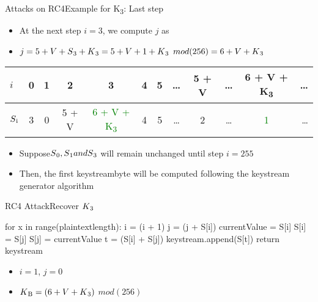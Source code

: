 \documentclass[
	aspectratio=169,	%
	onlytextwidth,		%
	t,					%
	]{beamer}
\begin{document}
\begin{frame}[fragile]{Attacks on RC4}{Example for K\textsubscript{3}: Last step}

	
	\begin{itemize}
		\item At the next step $i = 3$, we compute $j$ as
		\item $j = 5 + V + S\textsubscript{3} + K\textsubscript{3} = 5 + V + 1 + K\textsubscript{3}$ $mod(256) = 6 + V + K\textsubscript{3}$
	\end{itemize}
	
	\begin{table}[h!]
		\begin{center}
			\label{tab:table5}
			\begin{tabular}{l|c|c|c|c|c|c|c|c|c|c|r}
			$i$ & 0 & 1 & 2 & 3 & 4 & 5 & \dots & 5 + V & \dots & 6 + V + K\textsubscript{3} & \dots\\
			\hline
			$S\textsubscript{i}$ & 3 & 0 & 5 + V & \textcolor{green}{6 + V + K\textsubscript{3}} & 4 & 5 & \dots & 2 & \dots & \textcolor{green}{1} & \dots\\
			\end{tabular}
		\end{center}
	\end{table}

	\begin{itemize}
		\item Suppose$ S\textsubscript{0}, S\textsubscript{1} and S\textsubscript{3}$ will remain unchanged until step $i = 255$
		\item Then, the first keystreambyte will be computed following the keystream generator algorithm
	\end{itemize}

\end{frame}

\begin{frame}[fragile]{RC4 Attack}{Recover $K\textsubscript{3}$}

	\begin{python}
		for x in range(plaintextlength):
			i = (i + 1) %
			j = (j + S[i]) %
			currentValue = S[i]
			S[i] = S[j]
			S[j] = currentValue
			t = (S[i] + S[j]) %
			keystream.append(S[t])
		return keystream
	\end{python}

	\begin{itemize}
		\item $i = 1$, $j = 0$
		\item $K\textsubscript{B} = (6 + V + K\textsubscript{3})$ $mod(256)$
	\end{itemize}

\end{frame}
\end{document}

